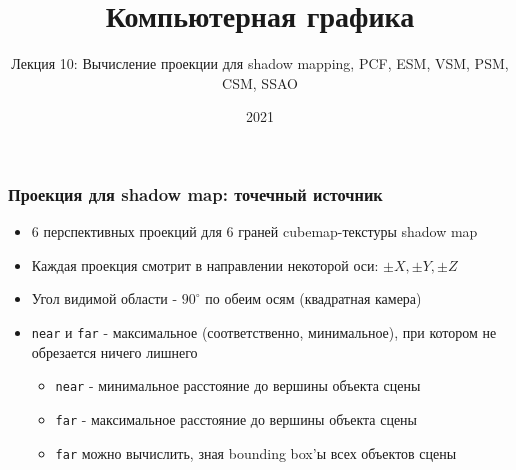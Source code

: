 \documentclass{beamer}
\title{Компьютерная графика}
\subtitle{Лекция 10: Вычисление проекции для shadow mapping, PCF, ESM, VSM, PSM, CSM, SSAO}
\date{2021}
\begin{document}
\frame{\titlepage}

\begin{frame}[fragile]
\frametitle{Проекция для shadow map: точечный источник}
\begin{itemize}
\item 6 перспективных проекций для 6 граней cubemap-текстуры shadow map
\pause
\item Каждая проекция смотрит в направлении некоторой оси: \begin{math}\pm X, \pm Y, \pm Z\end{math}
\pause
\item Угол видимой области - \begin{math}90^\circ\end{math} по обеим осям (квадратная камера)
\pause
\item \verb|near| и \verb|far| - максимальное (соответственно, минимальное), при котором не обрезается ничего лишнего
\pause
\begin{itemize}
\item \verb|near| - минимальное расстояние до вершины объекта сцены
\item \verb|far| - максимальное расстояние до вершины объекта сцены
\pause
\item \verb|far| можно вычислить, зная bounding box'ы всех объектов сцены
\end{itemize}
\end{itemize}
\end{frame}
\end{document}
